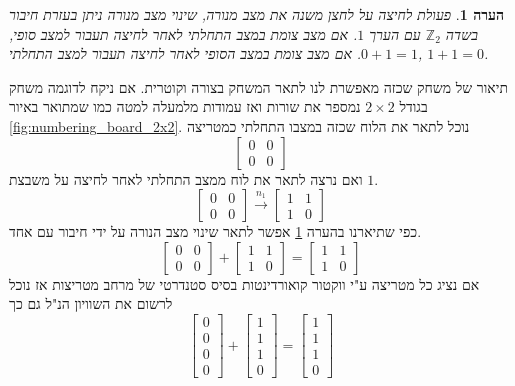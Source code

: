 \documentclass[12pt,leqno]{article}
\theoremstyle{theoremdd}
\newtheorem{comm}{הערה}[section]
\begin{document}
\begin{comm}
    \label{comm: sum as press operator on board}
    פעולת לחיצה על לחצן משנה 
    את מצב מנורה,
    שינוי מצב מנורה ניתן 
    בעזרת חיבור 
    בשדה 
    $\mathbb{Z}_2$
    עם הערך 
    $1$.
    אם מצב צומת במצב התחלתי לאחר לחיצה 
    תעבור למצב 
    סופי,
    $0+1=1$.
    אם מצב צומת במצב הסופי לאחר לחיצה 
    תעבור למצב 
    התחלתי,
    $1+1=0$.
\end{comm}
תיאור של משחק שכזה מאפשרת לנו
לתאר המשחק בצורה וקוטרית.
אם ניקח לדוגמה
משחק בגודל
$2 \times 2$
נמספר את 
שורות ואז עמודות מלמעלה למטה כמו שמתואר באיור
\ref{fig:numbering_board_2x2}.
נוכל לתאר את הלוח 
שכזה במצבו התחלתי כמטריצה
\[\begin{bmatrix}
0 & 0 \\
0 & 0 
\end{bmatrix}\]
ואם נרצה לתאר את לוח ממצב התחלתי לאחר לחיצה על משבצת 
$1$.
\[ 
    \begin{bmatrix}
    0 & 0 \\
    0 & 0 
    \end{bmatrix} \stackrel{n_1}{\longrightarrow}
    \begin{bmatrix}
    1 & 1 \\
    1 & 0 
    \end{bmatrix}
 \]
 כפי שתיארנו 
 בהערה 
 \ref{comm: sum as press operator on board}
 אפשר לתאר שינוי מצב הנורה על ידי חיבור 
 עם אחד.
\[
    \begin{bmatrix}
    0 & 0 \\
    0 & 0 
    \end{bmatrix} + 
    \begin{bmatrix}
    1 & 1 \\
    1 & 0 
    \end{bmatrix}=
    \begin{bmatrix}
    1 & 1 \\
    1 & 0 
    \end{bmatrix} 
\]  
 אם נציג כל מטריצה ע"י ווקטור קואורדינטות בסיס סטנדרטי של מרחב מטריצות אז נוכל לרשום את השוויון הנ"ל גם כך
 \[ 
    \begin{bmatrix} 
    0 \\ 0 \\ 0 \\ 0
    \end{bmatrix} +  \begin{bmatrix} 
    1 \\ 1 \\ 1 \\ 0
    \end{bmatrix} =  \begin{bmatrix} 
    1 \\ 1 \\ 1 \\ 0
    \end{bmatrix}  
 \]
\end{document}
